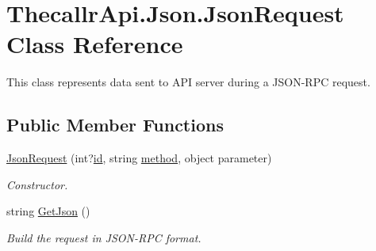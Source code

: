 \hypertarget{class_thecallr_api_1_1_json_1_1_json_request}{\section{Thecallr\+Api.\+Json.\+Json\+Request Class Reference}
\label{class_thecallr_api_1_1_json_1_1_json_request}
}


This class represents data sent to A\+P\+I server during a J\+S\+O\+N-\/\+R\+P\+C request.  


\subsection*{Public Member Functions}
\begin{DoxyCompactItemize}
\item 
\hyperlink{class_thecallr_api_1_1_json_1_1_json_request_af16927b283df49d006d0de8af860e5c3}{Json\+Request} (int?\hyperlink{class_thecallr_api_1_1_json_1_1_json_request_a1d4768420076b42a6a32dd793caf6523}{id}, string \hyperlink{class_thecallr_api_1_1_json_1_1_json_request_aaab569b47d1872369cf4872fc27a7be8}{method}, object parameter)
\begin{DoxyCompactList}\small\item\em Constructor. \end{DoxyCompactList}\item 
string \hyperlink{class_thecallr_api_1_1_json_1_1_json_request_a4d37a319a08ebe3b59b8e8ad727a7cae}{Get\+Json} ()
\begin{DoxyCompactList}\small\item\em Build the request in J\+S\+O\+N-\/\+R\+P\+C format. \end{DoxyCompactList}\end{DoxyCompactItemize}
